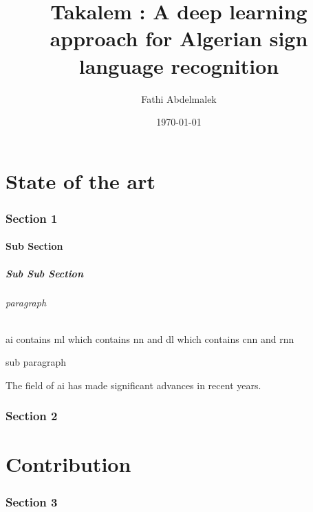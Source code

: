 \documentclass{article}
\title{Takalem : A deep learning approach for Algerian sign language recognition}
\author{Fathi Abdelmalek}
\date{\today}
\begin{document}
	\makeatletter
	
	\makeatother
	
	
	\printacronyms
	
	\tableofcontents
	\clearpage
	\listoffigures
	\clearpage
	\listoftables
	\clearpage
	\clearpage
	\part{State of the art}
	\section{Section 1}
	\subsection{Sub Section}
	\subsubsection{Sub Sub Section}
	\paragraph{paragraph}
	\ac{ai} contains \ac{ml} which contains \ac{nn} and \ac{dl} which contains \ac{cnn} and \ac{rnn}
	\subparagraph{sub paragraph}
	The field of \ac{ai} has made significant advances in recent years.
	\section{Section 2}
	\part{Contribution}
	\section{Section 3}
	\newpage
	
	
\end{document}
